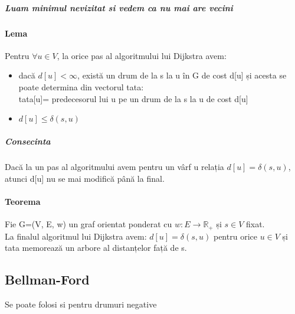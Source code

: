 \documentclass{article}
\begin{document}
\subparagraph*{Luam minimul nevizitat si vedem ca nu mai are vecini}

\begin{center}
\end{center}

\paragraph*{Lema}
Pentru $\forall u\in V$, la orice pas al algoritmului lui Dijkstra avem:
\begin{itemize}
    \item dacă $d[u]<\infty$, există un drum de la s la u în G de cost d[u] și acesta se poate determina din vectorul tata: \\ tata[u]= predecesorul lui u pe un drum de la s la u de cost d[u]
    \item $d[u] \leq \delta(s,u)$
\end{itemize}
\subparagraph*{Consecinta} Dacă la un pas al algoritmului avem pentru un vârf u relația $d[u] = \delta(s, u)$, atunci d[u] nu se mai modifică până la final.

\paragraph*{Teorema} Fie G=(V, E, w) un graf orientat ponderat cu $w : E \to \mathbb{R}_+$ și $s \in V$ fixat.\\
La finalul algoritmul lui Dijkstra avem:
$d[u] = \delta(s, u)$ pentru orice $u \in V$ și tata memorează un arbore al distanțelor față de s.

\subsection*{Bellman-Ford}
Se poate folosi si pentru drumuri negative
\end{document}
